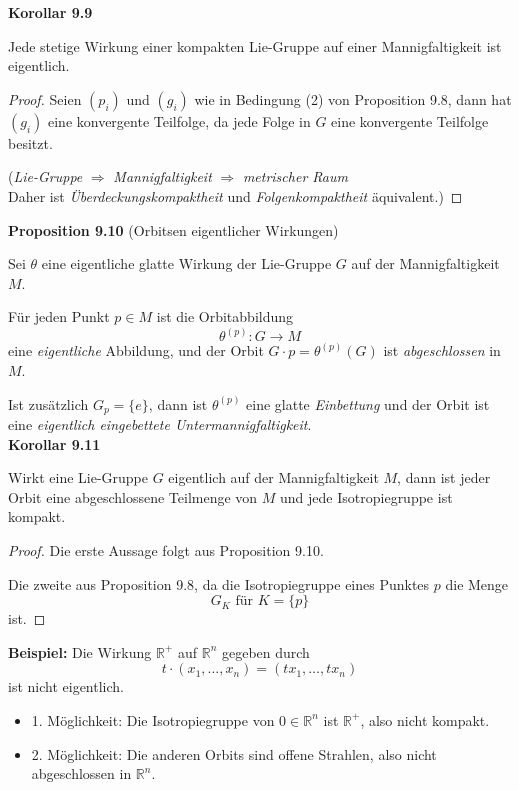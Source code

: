 \documentclass[fleqn, 12pt, letterpaper]{article}
\begin{document}
\textbf{Korollar 9.9}

Jede stetige Wirkung einer kompakten Lie-Gruppe auf einer Mannigfaltigkeit ist eigentlich.


\begin{proof}
Seien \( (p_i) \) und \( (g_i) \) wie in Bedingung (2) von Proposition 9.8, dann hat \( (g_i) \) eine konvergente Teilfolge, da jede Folge in \( G \) eine konvergente Teilfolge besitzt.

\bigskip

(\emph{Lie-Gruppe} \( \Rightarrow \) \emph{Mannigfaltigkeit} \( \Rightarrow \) \emph{metrischer Raum} \\
Daher ist \emph{Überdeckungskompaktheit} und \emph{Folgenkompaktheit} äquivalent.)
\end{proof}

\textbf{Proposition 9.10} (Orbitsen eigentlicher Wirkungen)

Sei \( \theta \) eine eigentliche glatte Wirkung der Lie-Gruppe \( G \) auf der Mannigfaltigkeit \( M \).

Für jeden Punkt \( p \in M \) ist die Orbitabbildung
\[
\theta^{(p)} : G \to M
\]
eine \textit{eigentliche} Abbildung, und der Orbit \( G \cdot p = \theta^{(p)}(G) \) ist \textit{abgeschlossen} in \( M \).

Ist zusätzlich \( G_p = \{e\} \), dann ist \( \theta^{(p)} \) eine glatte \textit{Einbettung} und der Orbit ist eine \textit{eigentlich eingebettete Untermannigfaltigkeit}.\\


\textbf{Korollar 9.11}

Wirkt eine Lie-Gruppe \( G \) {eigentlich} auf der Mannigfaltigkeit \( M \), dann ist jeder Orbit 
eine {abgeschlossene} Teilmenge von \( M \) und jede {Isotropiegruppe} ist {kompakt}.

\begin{proof}
Die erste Aussage folgt aus Proposition 9.10.

Die zweite aus Proposition 9.8, da die Isotropiegruppe eines Punktes \( p \) die Menge 
\[
G_K \text{ für } K = \{p\}
\]
ist.
\end{proof}

\textbf{Beispiel:} Die Wirkung \( \mathbb{R}^+ \) auf \( \mathbb{R}^n \) gegeben durch
\[
t \cdot (x_1, \dots, x_n) = (t x_1, \dots, t x_n)
\]
ist {nicht eigentlich}.

\begin{itemize}
    \item 1. Möglichkeit: Die Isotropiegruppe von \( 0 \in \mathbb{R}^n \) ist \( \mathbb{R}^+ \), also {nicht kompakt}.
    \item 2. Möglichkeit: Die anderen Orbits sind {offene Strahlen}, also nicht {abgeschlossen} in \( \mathbb{R}^n \).
\end{itemize}
\end{document}
